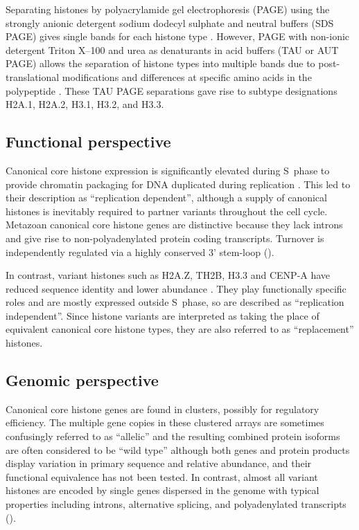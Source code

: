     Separating histones by polyacrylamide gel electrophoresis (PAGE)
    using the strongly anionic detergent sodium dodecyl sulphate and neutral buffers (SDS PAGE)
    gives single bands for each histone type \citep{ShechterHake2007}.
    However, PAGE with non-ionic detergent Triton X--100 and urea as denaturants
    in acid buffers (TAU or AUT PAGE) allows the separation
    of histone types into multiple bands
    due to post-translational modifications and differences at specific amino acids
    in the polypeptide \citep{Zweidler1977}.
    These TAU PAGE separations gave rise to subtype designations
    H2A.1, H2A.2, H3.1, H3.2, and H3.3.

  \subsection{Functional perspective}

    Canonical core histone expression
    is significantly elevated during S~phase to provide chromatin packaging
    for DNA duplicated during replication \citep{WuBonner1981}.
    This led to their description as ``replication dependent'',
    although a supply of canonical histones is inevitably required
    to partner variants throughout the cell cycle.
    Metazoan canonical core histone genes are distinctive
    because they lack introns and give rise to non-polyadenylated protein coding transcripts.
    Turnover is independently regulated via a highly
    conserved 3' stem-loop ().

    In contrast, variant histones such as H2A.Z, TH2B, H3.3 and CENP-A have
    reduced sequence identity and lower abundance \citep{TalbertHenikoff2010}.
    They play functionally specific roles and are mostly expressed outside S~phase,
    so are described as ``replication independent''.
    Since histone variants are interpreted as taking the place
    of equivalent canonical core histone types,
    they are also referred to as ``replacement'' histones.

  \subsection{Genomic perspective}

    Canonical core histone genes are found in \NumberOfClusters{} clusters,
    possibly for regulatory efficiency.
    The multiple gene copies in these clustered arrays are
    sometimes confusingly referred to as ``allelic''
    and the resulting combined protein isoforms are often considered to be ``wild type''
    although both genes and protein products display
    variation in primary sequence and relative abundance,
    and their functional equivalence has not been tested.
    In contrast, almost all variant histones are encoded by single genes dispersed in the genome
    with typical properties including introns, alternative splicing,
    and polyadenylated transcripts ().

